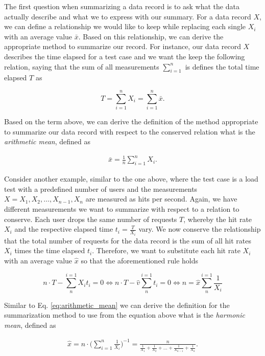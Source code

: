 The first question when summarizing a data
record is to ask what the data actually describe and what we to express with our
summary. For a data record $X$, we can define a
relationship we would like to keep while replacing each single $X_i$ with an
average value $\bar{x}$. Based on this relationship, we can derive the
appropriate method to summarize our record. For instance, our data record $X$
describes the time elapsed for a test case and we want the keep the following
relation, saying that the sum of all measurements $\sum_{i = 1}^{n}$ is defines
the total time elapsed $T$ as

$$
T = \sum_{i = 1}^{n} X_i = \sum_{i = 1}^{n} \bar{x}.
$$

Based on the term above, we can derive the definition of the method
appropriate to summarize our data record with respect to the conserved relation
what is the \emph{arithmetic mean}, defined as

\begin{equation} \label{eq:arithmetic_mean}
\begin{split}
\bar{x} = \frac{1}{n} \sum_{i = 1}^{n} X_i.
\end{split}
\end{equation}

Consider another example, similar to the one above, where the test
case is a load test with a predefined number of users and the measurements $X =
X_1, X_2, \ldots, X_{n-1}, X_n$ are
measured as hits per second. Again, we have different measurements we want to
summarize with respect to a relation to conserve. Each user drops the same
number of requests $T$, whereby the hit rate $X_i$ and the respective elapsed
time $t_i = \frac{T}{X_i }$ vary. We now conserve the relationship that the
total number of requests for the data record is the sum of all hit rates $X_i$
times the time elapsed $t_i$. Therefore, we want to substitute each hit rate
$X_i$ with an average value $\hat{x}$ so that the aforementioned rule holds

$$
n\cdot T - \sum_{n}^{i=1} X_it_i = 0 \Leftrightarrow n\cdot T - \hat{v}
\sum_{n}^{i=1} t_i = 0 \Leftrightarrow n = \hat{x} \sum_{n}^{i=1} \frac{1}{X_i}
$$

Similar to Eq. \ref{eq:arithmetic_mean} we can derive the definition for the summarization
method to use from the equation above what is the \emph{harmonic mean}, defined as

\begin{equation} \label{eq:harmonic_mean}
\begin{split}
\hat{x} = n \cdot \bigg(\sum_{i=1}^{n} \frac{1}{X_i}\bigg)^{-1} =
\frac{n}{\frac{1}{X_1} + \frac{1}{X_2} + \ldots +
\frac{1}{X_{n-1}} + \frac{1}{X_n}}.
\end{split}
\end{equation}

